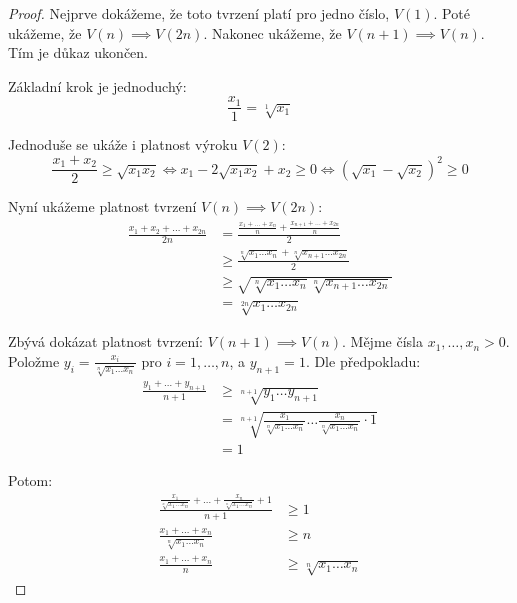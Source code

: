 \begin{proof}
    Nejprve dokážeme, že toto
    tvrzení platí pro jedno číslo, $V(1)$. Poté ukážeme, že $V(n) \implies 
    V(2n)$. Nakonec ukážeme, že $V(n+1) \implies V(n)$. Tím je důkaz ukončen.

    Základní krok je jednoduchý:
    $$\frac{x_1}{1} = \sqrt[1]{x_1}$$

    Jednoduše se ukáže i platnost výroku $V(2)$:
    $$\frac{x_1 + x_2}{2} \geq \sqrt{x_1x_2} 
        \iff x_1 - 2\sqrt{x_1x_2} + x_2 \geq 0 
        \iff (\sqrt{x_1} - \sqrt{x_2})^2 \geq 0$$

    Nyní ukážeme platnost tvrzení $V(n) \implies V(2n)$:
    \begin{align*}
        \frac{x_1 + x_2 + \dots + x_{2n}}{2n} 
            &= \frac{\frac{x_1 + \dots + x_n}{n} + \frac{x_{n+1} + 
                \dots + x_{2n}}{n}}{2} \\
            &\geq \frac{\sqrt[n]{x_1 \dots x_n} + \sqrt[n]{x_{n+1} \dots 
                x_{2n}}}{2} \tag{indukční předpoklad $V(n)$} \\
            &\geq \sqrt{\sqrt[n]{x_1 \dots x_n} \sqrt[n]{x_{n+1} \dots x_{2n}}} 
                \tag{$V(2)$} \\
            &= \sqrt[2n]{x_1 \dots x_{2n}}
    \end{align*}

    Zbývá dokázat platnost tvrzení: $V(n+1) \implies V(n)$. Mějme čísla $x_1,
    \dots, x_n >0$. Položme $y_i = \frac{x_i}{\sqrt[n]{x_1 \dots x_n}}$ pro
    $i = 1, \dots, n$, a $y_{n+1} = 1$. Dle předpokladu:
    \begin{align*}
        \frac{y_1 + \dots + y_{n+1}}{n+1} 
            &\geq \sqrt[n+1]{y_1 \dots y_{n+1}} \\
            &=\sqrt[n+1]{\frac{x_1}{\sqrt[n]{x_1 \dots x_n}} \dots 
                \frac{x_n}{\sqrt[n]{x_1 \dots x_n}} \cdot 1} \\
            &= 1
    \end{align*}

    Potom:
    \begin{align*}
        \frac{\frac{x_1}{\sqrt[n]{x_1 \dots x_n}} + \dots + 
        \frac{x_n}{\sqrt[n]{x_1 \dots x_n}} + 1}{n+1} &\geq 1 \\
        \frac{x_1 + \dots + x_n}{\sqrt[n]{x_1 \dots x_n}} &\geq n \\
        \frac{x_1 + \dots + x_n}{n} &\geq \sqrt[n]{x_1 \dots x_n}
    \end{align*}
\end{proof}

